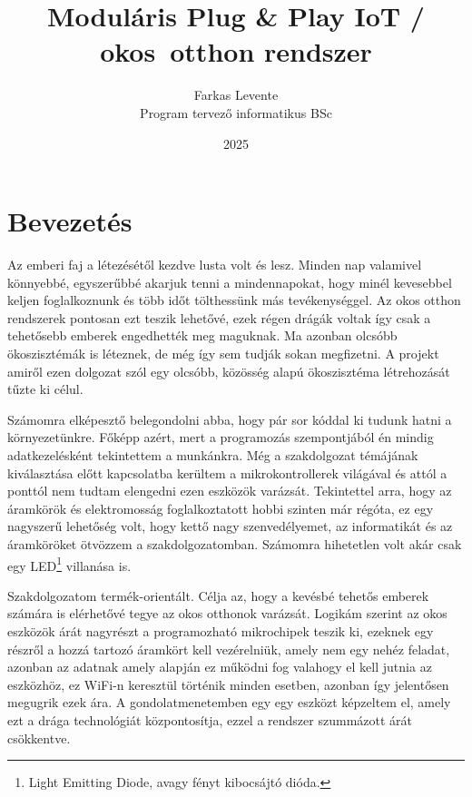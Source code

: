 \documentclass{thesis-ekf}
\theoremstyle{definition}
\theoremstyle{remark}
\begin{document}
	
	\title{Moduláris Plug \& Play IoT / okos~otthon rendszer}
	\author{Farkas Levente\\Program tervező informatikus BSc}
	\date{2025}
	\maketitle
	\tableofcontents
	\chapter*{Bevezetés}
	
	Az emberi faj a létezésétől kezdve lusta volt és lesz. Minden nap valamivel könnyebbé, egyszerűbbé akarjuk tenni a mindennapokat, hogy minél kevesebbel keljen foglalkoznunk és több időt tölthessünk más tevékenységgel. Az okos otthon rendszerek pontosan ezt teszik lehetővé, ezek régen drágák voltak így csak a tehetősebb emberek engedhették meg maguknak. Ma azonban olcsóbb ökoszisztémák is léteznek, de még így sem tudják sokan megfizetni. A projekt amiről ezen dolgozat szól egy olcsóbb, közösség alapú ökoszisztéma létrehozását tűzte ki célul.
	
	Számomra elképesztő belegondolni abba, hogy pár sor kóddal ki tudunk hatni a környezetünkre. Főképp azért, mert a programozás szempontjából én mindig adatkezelésként tekintettem a munkánkra. Még a szakdolgozat témájának kiválasztása előtt kapcsolatba kerültem a mikrokontrollerek világával és attól a ponttól nem tudtam elengedni ezen eszközök varázsát. Tekintettel arra, hogy az áramkörök és elektromosság foglalkoztatott hobbi szinten már régóta, ez egy nagyszerű lehetőség volt, hogy kettő nagy szenvedélyemet, az informatikát és az áramköröket ötvözzem a szakdolgozatomban. Számomra hihetetlen volt akár csak egy LED\footnote{Light Emitting Diode, avagy fényt kibocsájtó dióda.} villanása is.
	
	Szakdolgozatom termék-orientált. Célja az, hogy a kevésbé tehetős emberek számára is elérhetővé tegye az okos otthonok varázsát. Logikám szerint az okos eszközök árát nagyrészt a programozható mikrochipek teszik ki, ezeknek egy részről a hozzá tartozó áramkört kell vezérelniük, amely nem egy nehéz feladat, azonban az adatnak amely alapján ez működni fog valahogy el kell jutnia az eszközhöz, ez WiFi-n keresztül történik minden esetben, azonban így jelentősen megugrik ezek ára. A gondolatmenetemben egy egy eszközt képzeltem el, amely ezt a drága technológiát központosítja, ezzel a rendszer szummázott árát csökkentve.
	
\end{document}
